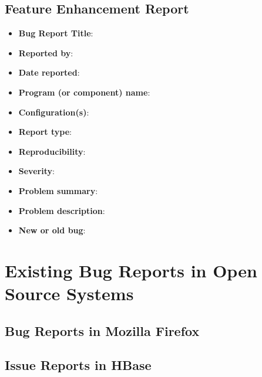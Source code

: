 \documentclass[fontsize=12pt,paper=letter,twoside]{scrartcl}
\begin{document}
\newpage
\subsection{Feature Enhancement Report}

\begin{itemize}
\item \textbf{Bug Report Title}:
\item \textbf{Reported by}:
\item \textbf{Date reported}:
\item \textbf{Program (or component) name}:
\item \textbf{Configuration(s)}:
\item \textbf{Report type}:
\item \textbf{Reproducibility}:
\item \textbf{Severity}:
\item \textbf{Problem summary}:
\item \textbf{Problem description}:
\item \textbf{New or old bug}:
\end{itemize}

\newpage
\section{Existing Bug Reports in Open Source Systems}

\subsection{Bug Reports in Mozilla Firefox}

\subsection{Issue Reports in HBase}
\end{document}
